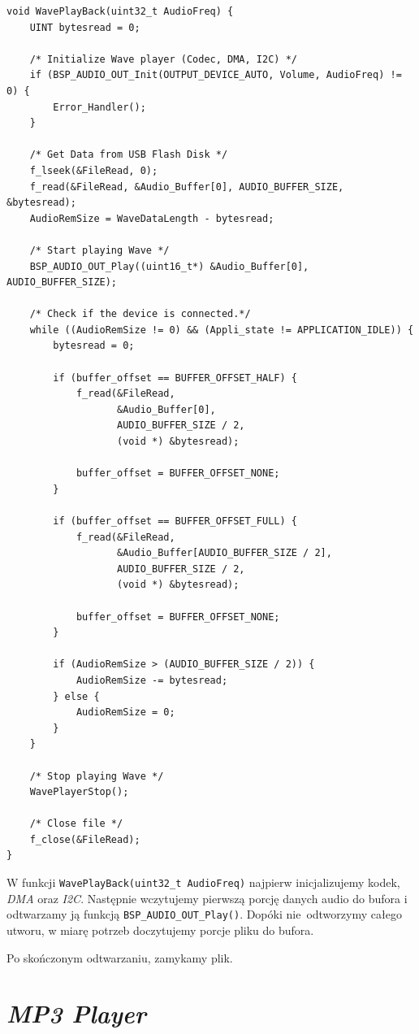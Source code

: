 \documentclass[12pt,a4paper]{article}
\begin{document}
\begin{lstlisting}
void WavePlayBack(uint32_t AudioFreq) {
    UINT bytesread = 0;

    /* Initialize Wave player (Codec, DMA, I2C) */
    if (BSP_AUDIO_OUT_Init(OUTPUT_DEVICE_AUTO, Volume, AudioFreq) != 0) {
        Error_Handler();
    }

    /* Get Data from USB Flash Disk */
    f_lseek(&FileRead, 0);
    f_read(&FileRead, &Audio_Buffer[0], AUDIO_BUFFER_SIZE, &bytesread);
    AudioRemSize = WaveDataLength - bytesread;

    /* Start playing Wave */
    BSP_AUDIO_OUT_Play((uint16_t*) &Audio_Buffer[0], AUDIO_BUFFER_SIZE);

    /* Check if the device is connected.*/
    while ((AudioRemSize != 0) && (Appli_state != APPLICATION_IDLE)) {
        bytesread = 0;

        if (buffer_offset == BUFFER_OFFSET_HALF) {
            f_read(&FileRead,
                   &Audio_Buffer[0],
                   AUDIO_BUFFER_SIZE / 2,
                   (void *) &bytesread);

            buffer_offset = BUFFER_OFFSET_NONE;
        }

        if (buffer_offset == BUFFER_OFFSET_FULL) {
            f_read(&FileRead,
                   &Audio_Buffer[AUDIO_BUFFER_SIZE / 2],
                   AUDIO_BUFFER_SIZE / 2,
                   (void *) &bytesread);

            buffer_offset = BUFFER_OFFSET_NONE;
        }

        if (AudioRemSize > (AUDIO_BUFFER_SIZE / 2)) {
            AudioRemSize -= bytesread;
        } else {
            AudioRemSize = 0;
        }
    }

    /* Stop playing Wave */
    WavePlayerStop();

    /* Close file */
    f_close(&FileRead);
}
\end{lstlisting}

W funkcji \texttt{WavePlayBack(uint32\_t AudioFreq)} najpierw inicjalizujemy kodek, \emph{DMA} oraz \emph{I2C}. Następnie wczytujemy pierwszą porcję danych audio do bufora i odtwarzamy ją funkcją \texttt{BSP\_AUDIO\_OUT\_Play()}. Dopóki nie~odtworzymy całego utworu, w miarę potrzeb doczytujemy porcje pliku do bufora.

Po skończonym odtwarzaniu, zamykamy plik.

\section{\emph{MP3 Player}}
\end{document}
